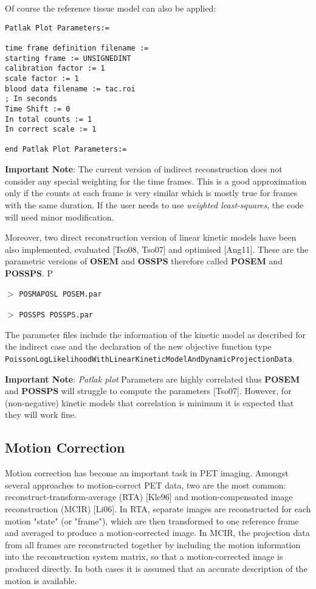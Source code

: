 \documentclass{article}
\newcommand{\cmdline}[1]{\par \noindent $>$ \texttt{#1}\par}
\begin{document}
Of course the reference tissue model can also be applied: 

\begin{verbatim}
Patlak Plot Parameters:=

time frame definition filename := 
starting frame := UNSIGNEDINT
calibration factor := 1
scale factor := 1
blood data filename := tac.roi
; In seconds
Time Shift := 0
In total counts := 1
In correct scale := 1

end Patlak Plot Parameters:=
\end{verbatim}

\textbf{Important Note}: The current version of indirect reconstruction does not consider any special weighting for the time frames. This is a good approximation only if the counts at each frame is very similar which is mostly true for frames with the same duration. If the user needs to use  \textit{weighted least-squares}, the code will need minor modification.

Moreover, two direct reconstruction version of linear kinetic models have been also implemented, evaluated [Tso08, Tso07] and optimised [Ang11]. These are the parametric versions of \textbf{OSEM} and \textbf{OSSPS} therefore called \textbf{POSEM} and \textbf{POSSPS}. 
P
\cmdline{POSMAPOSL POSEM.par}
\cmdline{POSSPS POSSPS.par}


The parameter files include the information of the kinetic model as described for the indirect case and the declaration of the new objective function type\\
\texttt{PoissonLogLikelihoodWithLinearKineticModelAndDynamicProjectionData}.


\textbf{Important Note}:  \textit{Patlak plot} Parameters are highly correlated thus \textbf{POSEM} and \textbf{POSSPS} will struggle to compute the parameters [Tso07]. However, for (non-negative) kinetic models that correlation is minimum it is expected that they will work fine.


\subsection{
Motion Correction}
Motion correction has become an important task in PET imaging. Amongst several approaches to
motion-correct PET data, two are the most common: reconstruct-transform-average (RTA) [Kle96] and
motion-compensated image reconstruction (MCIR) [Li06]. In RTA, separate images are reconstructed for each
motion "state" (or "frame"), which are then transformed to one reference frame and averaged to produce a
motion-corrected image. In MCIR, the projection data from all frames are reconstructed together by
including the motion information into the reconstruction system matrix, so that a motion-corrected image
is produced directly. In both cases it is assumed that an accurate description of the motion is
available.
\end{document}
